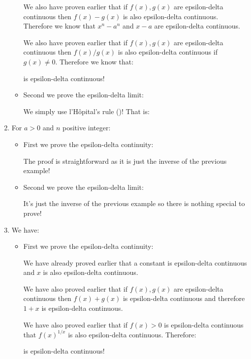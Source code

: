 \begin{enumerate}
\begin{itemize}
			We also have proven earlier that if $f(x),g(x)$ are epsilon-delta continuous then $f(x)-g(x)$ is also epsilon-delta continuous. Therefore we know that $x^n-a^n$ and $x-a$ are epsilon-delta continuous.
			
			We also have proven earlier that if $f(x),g(x)$ are epsilon-delta continuous then $f(x)/g(x)$ is also epsilon-delta continuous if $g(x)\neq 0$. Therefore we know that:
			
			is epsilon-delta continuous!
			
			\item Second we prove the epsilon-delta limit:
			
			We simply use l'Hôpital's rule ()! That is:
			
		\end{itemize}
		
		\item For $a>0$ and $n$ positive integer:
		
		
		\begin{itemize}
			\item First we prove the epsilon-delta continuity:
			
			The proof is straightforward as it is just the inverse of the previous example!
			
			\item Second we prove the epsilon-delta limit:
			
			It's just the inverse of the previous example so there is nothing special to prove!
		\end{itemize}
		
		\item We have:
		
		
		\begin{itemize}
			\item First we prove the epsilon-delta continuity:
			
			We have already proved earlier that a constant is epsilon-delta continuous and $x$ is also epsilon-delta continuous.
			
			We have also proved earlier that if $f(x),g(x)$ are epsilon-delta continuous then $f(x)+g(x)$ is epsilon-delta continuous and therefore $1+x$ is epsilon-delta continuous.
			
			We have also proved earlier that if $f(x)>0$ is epsilon-delta continuous that $f(x)^{1/x}$ is also epsilon-delta continuous. Therefore:
			
			is epsilon-delta continuous!
			

\end{itemize}
\end{enumerate}

